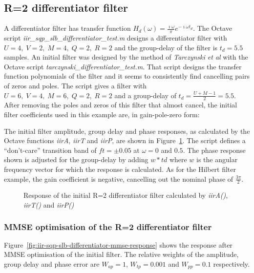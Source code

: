\documentclass[a4paper,twoside,10pt,english]{report}
\begin{document}
\subsection{R=2 differentiator filter}
A differentiator filter has transfer function
$H_{d}\left(\omega\right)=\frac{\imath\omega}{\pi}e ^{-\imath\omega t_{d}}$.
The Octave script \emph{iir\_sqp\_slb\_differentiator\_test.m} designs a
differentiator filter with $U=4,\;V=2,\;M=4,\;Q=2,\;R=2$ and the group-delay
of the filter is $t_{d}=5.5$ samples. An initial filter was designed by the
method of \emph{Tarczynski et al} with the Octave script
\emph{tarczynski\_differentiator\_test.m}. That script designs the transfer
function polynomials of the filter and it seems to consistently find
cancelling pairs of zeros and poles. The script gives a filter with
$U=6,\;V=4,\;M=6,\;Q=2,\;R=2$ and a group-delay of
$t_{d}=\frac{U+M-1}{2}=5.5$.  After removing the poles and zeros of this
filter that almost cancel, the initial filter coefficients used in this
example are, in gain-pole-zero form:
\begin{small}

\end{small}
The initial filter amplitude, group delay and phase responses, as calculated
by the Octave functions \emph{iirA}, \emph{iirT} and \emph{iirP}, are shown in
Figure~\ref{fig:iir-sqp-slb-differentiator-initial-response}. The script
defines a ``don't-care'' transition band of $ft=\pm 0.05$ at $\omega=0$ and
$0.5$. The phase response shown is adjusted for the group-delay by adding
$w*td$ where $w$ is the angular frequency vector for which the response is
calculated. As for the Hilbert filter example, the gain coefficient is
negative, cancelling out the nominal phase of $\frac{3\pi}{2}$.
\begin{figure}[!htbp]
\begin{center}
\scalebox{0.7}{}
\caption{Response of the initial R=2 differentiator filter calculated by
\emph{iirA()}, \emph{iirT()} and \emph{iirP()}}
\label{fig:iir-sqp-slb-differentiator-initial-response}
\end{center}
\end{figure}

\subsubsection{\label{sub:MMSE-optimisation-of-the-R2-differentiator}MMSE optimisation of the R=2 differentiator filter}
Figure~\ref{fig:iir-sqp-slb-differentiator-mmse-response} shows the response
after MMSE optimisation of the initial filter. The relative weights of
the amplitude, group delay and phase error are $W_{ap}=1$, $W_{tp}=0.001$ and
$W_{pp}=0.1$ respectively.
\end{document}
